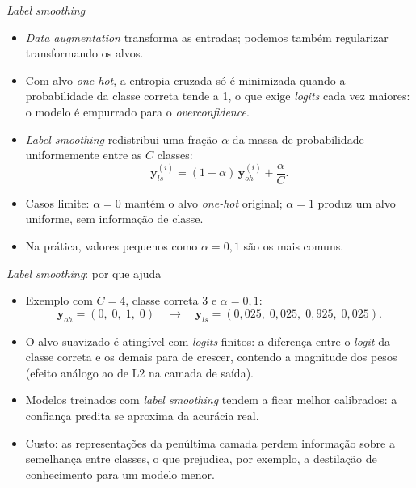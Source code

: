\documentclass[aspectratio=169,xcolor=dvipsnames]{beamer}
\begin{document}
  \begin{frame}{\textit{Label smoothing}}
    \begin{itemize}
      \item \textit{Data augmentation} transforma as \alert{entradas};
        podemos também regularizar transformando os \alert{alvos}.
      \item Com alvo \textit{one-hot}, a entropia cruzada só é minimizada
        quando a probabilidade da classe correta tende a 1, o que exige
        \textit{logits} cada vez maiores: o modelo é empurrado para o
        \alert{\textit{overconfidence}}.
      \item \textit{Label smoothing} redistribui uma fração $\alpha$ da massa
        de probabilidade uniformemente entre as $C$ classes:
        $$\mathbf{y}^{(i)}_{ls} = (1 - \alpha)\,\mathbf{y}^{(i)}_{oh} + \frac{\alpha}{C}.$$
      \item Casos limite: $\alpha = 0$ mantém o alvo \textit{one-hot} original;
        $\alpha = 1$ produz um alvo uniforme, sem informação de classe.
      \item Na prática, valores pequenos como $\alpha = 0{,}1$ são os mais comuns.
    \end{itemize}
  \end{frame}

  \begin{frame}{\textit{Label smoothing}: por que ajuda}
    \begin{itemize}
      \item Exemplo com $C = 4$, classe correta 3 e $\alpha = 0{,}1$:
        $$\mathbf{y}_{oh} = (0,\; 0,\; 1,\; 0)
          \quad\longrightarrow\quad
          \mathbf{y}_{ls} = (0{,}025,\; 0{,}025,\; 0{,}925,\; 0{,}025).$$
      \item O alvo suavizado é atingível com \textit{logits} \alert{finitos}:
        a diferença entre o \textit{logit} da classe correta e os demais
        para de crescer, contendo a magnitude dos pesos
        (efeito análogo ao de L2 na camada de saída).
      \item Modelos treinados com \textit{label smoothing} tendem a ficar
        \alert{melhor calibrados}: a confiança predita se aproxima da
        acurácia real.
      \item Custo: as representações da penúltima camada perdem informação
        sobre a semelhança entre classes, o que prejudica, por exemplo,
        a destilação de conhecimento para um modelo menor.
    \end{itemize}
  \end{frame}
\end{document}
